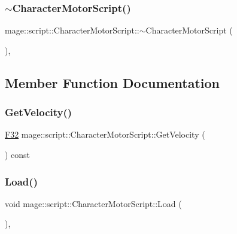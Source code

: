 \subsubsection{\texorpdfstring{$\sim$\+Character\+Motor\+Script()}{~CharacterMotorScript()}}
{\footnotesize\ttfamily mage\+::script\+::\+Character\+Motor\+Script\+::$\sim$\+Character\+Motor\+Script (\begin{DoxyParamCaption}{ }\end{DoxyParamCaption})\hspace{0.3cm}{\ttfamily [virtual]}, {\ttfamily [default]}}



\subsection{Member Function Documentation}
\hypertarget{classmage_1_1script_1_1_character_motor_script_a24edb3337af40e7326c424bc6b93c3fa}{}\label{classmage_1_1script_1_1_character_motor_script_a24edb3337af40e7326c424bc6b93c3fa} 
\subsubsection{\texorpdfstring{Get\+Velocity()}{GetVelocity()}}
{\footnotesize\ttfamily \hyperlink{namespacemage_aa97e833b45f06d60a0a9c4fc22ae02c0}{F32} mage\+::script\+::\+Character\+Motor\+Script\+::\+Get\+Velocity (\begin{DoxyParamCaption}{ }\end{DoxyParamCaption}) const\hspace{0.3cm}{\ttfamily [noexcept]}}

\hypertarget{classmage_1_1script_1_1_character_motor_script_aa07409b305e1766b69134f7884be7395}{}\label{classmage_1_1script_1_1_character_motor_script_aa07409b305e1766b69134f7884be7395} 
\subsubsection{\texorpdfstring{Load()}{Load()}}
{\footnotesize\ttfamily void mage\+::script\+::\+Character\+Motor\+Script\+::\+Load (\begin{DoxyParamCaption}{ }\end{DoxyParamCaption})\hspace{0.3cm}{\ttfamily [override]}, {\ttfamily [virtual]}}

